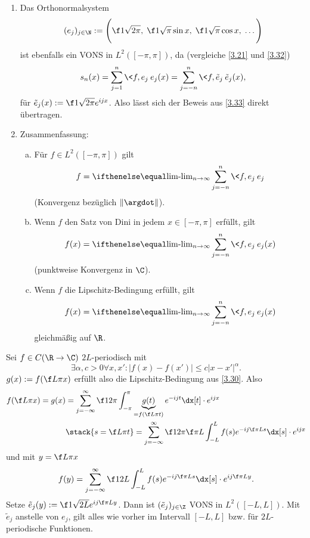 \begin{nt} \label{3.34}
	\begin{enumerate}[1)]
		\item
			Das Orthonormalsystem
			\[
				(e_j)_{j\in \N} := \Bigg( \f 1{\sqrt{2\pi}}, \; \f 1{\sqrt{\pi}} \sin x,\; \f 1{\sqrt{\pi}} \cos x,\; \dotsc \Bigg)
			\]
			ist ebenfalls ein VONS in $L^2([-\pi,\pi])$, da (vergleiche \ref{3.21} und \ref{3.32})
			\[
				s_n(x)
				= \sum_{j=1}^n \<f,e_j\> e_j(x)
				= \sum_{j=-n}^n \<f,\tilde e_j\> \tilde e_j(x),
			\]
			für $\tilde e_j(x) := \f 1{\sqrt{2\pi}} e^{ijx}$.
			Also lässt sich der Beweis aus \ref{3.33} direkt übertragen.
		\item
			Zusammenfassung:
			\begin{enumerate}[a)]
				\item
					Für $f \in L^2([-\pi,\pi])$ gilt
					\[
						f = \lim_{n\to \infty} \sum_{j=-n}^n \<f,e_j\> e_j
					\]
					(Konvergenz bezüglich $\|\argdot\|$).
				\item
					Wenn $f$ den Satz von Dini in jedem $x\in [-\pi,\pi]$ erfüllt, gilt
					\[
						f(x) = \lim_{n\to \infty} \sum_{j=-n}^n \<f,e_j\> e_j(x)
					\]
					(punktweise Konvergenz in $\C$).
				\item
					Wenn $f$ die Lipschitz-Bedingung erfüllt, gilt
					\[
						f(x) = \lim_{n\to\infty} \sum_{j=-n}^n \<f,e_j\> e_j(x)
					\]
					gleichmäßig auf $\R$.
			\end{enumerate}
	\end{enumerate}
\end{nt}

\begin{nt} \label{3.35}
	Sei $f \in C(\R \to \C)$ $2L$-periodisch mit
	\[
		\exists \alpha, c > 0 \forall x,x': |f(x) - f(x')| \le c |x-x'|^\alpha.
	\]
	$g(x) := f(\f L\pi x)$ erfüllt also die Lipschitz-Bedingung aus \ref{3.30}.
	Also
	\begin{align*}
		f(\f L\pi x) = g(x)
		&= \sum_{j=-\infty}^\infty \f 1{2\pi} \int_{-\pi}^\pi \underbrace{g(t)}_{=f(\f L\pi t)} e^{-ijt} \dx[t] \cdot e^{ijx} \\
		&\stack{s = \f L\pi t}= \sum_{j=-\infty}^\infty \f 1{2\pi} \f \pi L \int_{-L}^L f(s) e^{-ij \f \pi L s} \dx[s] \cdot e^{ijx}
	\end{align*}
	und mit $y = \f L \pi x$
	\[
		f(y) = \sum_{j=-\infty}^\infty \f 1{2L} \int_{-L}^L f(s) e^{-ij\f \pi L s} \dx[s] \cdot e^{ij \f \pi L y}.
	\]
	Setze $\tilde e_j(y) := \f 1{\sqrt{2L}} e^{ij \f \pi L y}$.
	Dann ist $(\tilde e_j)_{j\in \Z}$ VONS in $L^2([-L,L])$.
	Mit $\tilde e_j$ anstelle von $e_j$, gilt alles wie vorher im Intervall $[-L,L]$ bzw. für $2L$-periodische Funktionen.
\end{nt}


